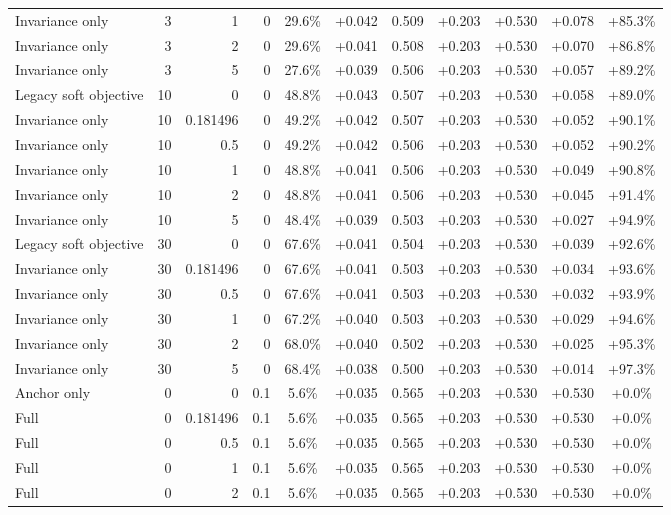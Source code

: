 \begin{table}[htbp]
\begin{tabular}{lrrrccccccc}
Invariance only & 3 & 1 & 0 & 29.6\% & +0.042 & 0.509 & +0.203 & +0.530 & +0.078 & +85.3\% \\
Invariance only & 3 & 2 & 0 & 29.6\% & +0.041 & 0.508 & +0.203 & +0.530 & +0.070 & +86.8\% \\
Invariance only & 3 & 5 & 0 & 27.6\% & +0.039 & 0.506 & +0.203 & +0.530 & +0.057 & +89.2\% \\
Legacy soft objective & 10 & 0 & 0 & 48.8\% & +0.043 & 0.507 & +0.203 & +0.530 & +0.058 & +89.0\% \\
Invariance only & 10 & 0.181496 & 0 & 49.2\% & +0.042 & 0.507 & +0.203 & +0.530 & +0.052 & +90.1\% \\
Invariance only & 10 & 0.5 & 0 & 49.2\% & +0.042 & 0.506 & +0.203 & +0.530 & +0.052 & +90.2\% \\
Invariance only & 10 & 1 & 0 & 48.8\% & +0.041 & 0.506 & +0.203 & +0.530 & +0.049 & +90.8\% \\
Invariance only & 10 & 2 & 0 & 48.8\% & +0.041 & 0.506 & +0.203 & +0.530 & +0.045 & +91.4\% \\
Invariance only & 10 & 5 & 0 & 48.4\% & +0.039 & 0.503 & +0.203 & +0.530 & +0.027 & +94.9\% \\
Legacy soft objective & 30 & 0 & 0 & 67.6\% & +0.041 & 0.504 & +0.203 & +0.530 & +0.039 & +92.6\% \\
Invariance only & 30 & 0.181496 & 0 & 67.6\% & +0.041 & 0.503 & +0.203 & +0.530 & +0.034 & +93.6\% \\
Invariance only & 30 & 0.5 & 0 & 67.6\% & +0.041 & 0.503 & +0.203 & +0.530 & +0.032 & +93.9\% \\
Invariance only & 30 & 1 & 0 & 67.2\% & +0.040 & 0.503 & +0.203 & +0.530 & +0.029 & +94.6\% \\
Invariance only & 30 & 2 & 0 & 68.0\% & +0.040 & 0.502 & +0.203 & +0.530 & +0.025 & +95.3\% \\
Invariance only & 30 & 5 & 0 & 68.4\% & +0.038 & 0.500 & +0.203 & +0.530 & +0.014 & +97.3\% \\
Anchor only & 0 & 0 & 0.1 & 5.6\% & +0.035 & 0.565 & +0.203 & +0.530 & +0.530 & +0.0\% \\
Full & 0 & 0.181496 & 0.1 & 5.6\% & +0.035 & 0.565 & +0.203 & +0.530 & +0.530 & +0.0\% \\
Full & 0 & 0.5 & 0.1 & 5.6\% & +0.035 & 0.565 & +0.203 & +0.530 & +0.530 & +0.0\% \\
Full & 0 & 1 & 0.1 & 5.6\% & +0.035 & 0.565 & +0.203 & +0.530 & +0.530 & +0.0\% \\
Full & 0 & 2 & 0.1 & 5.6\% & +0.035 & 0.565 & +0.203 & +0.530 & +0.530 & +0.0\% \\

\end{tabular}
\end{table}

